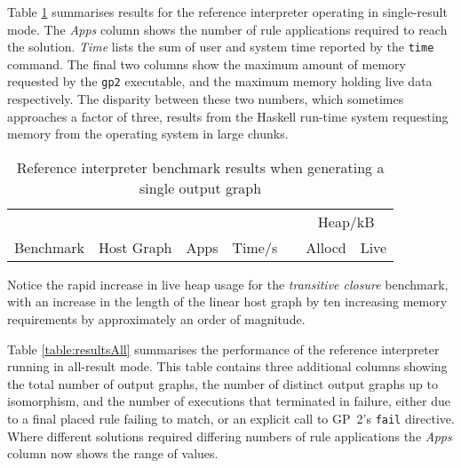 Table \ref{table:resultsSingle} summarises results for the reference interpreter operating in single-result mode. The \textit{Apps} column shows the number of rule applications required to reach the solution. \textit{Time} lists the sum of user and system time reported by the \texttt{time} command. The final two columns show the maximum amount of memory requested by the \texttt{gp2} executable, and the maximum memory holding live data respectively. The disparity between these two numbers, which sometimes approaches a factor of three, results from the Haskell run-time system requesting memory from the operating system in large chunks.

\begin{table}[h]
\begin{minipage}{\textwidth}
\centering

\begin{tabular}{llrrcrr}
\hline 
&  & & & & \multicolumn{2}{c}{Heap/kB}\\
Benchmark          & Host Graph & Apps & Time/s   & & Allocd & Live \\
\hline 

\end{tabular}

\caption[Reference interpreter benchmarks]{Reference interpreter benchmark results when generating a single output graph}

\label{table:resultsSingle}
\end{minipage}
\end{table}




Notice the rapid increase in live heap usage for the \textit{transitive closure} benchmark, with an increase in the length of the linear host graph by ten increasing memory requirements by approximately an order of magnitude. %


Table \ref{table:resultsAll} summarises the performance of the reference interpreter running in all-result mode. This table contains three additional columns showing the total number of output graphs, the number of distinct output graphs up to isomorphism, and the number of executions that terminated in failure, either due to a final placed rule failing to match, or an explicit call to GP~2's \texttt{fail} directive. Where different solutions required differing numbers of rule applications the \textit{Apps} column now shows the range of values.


